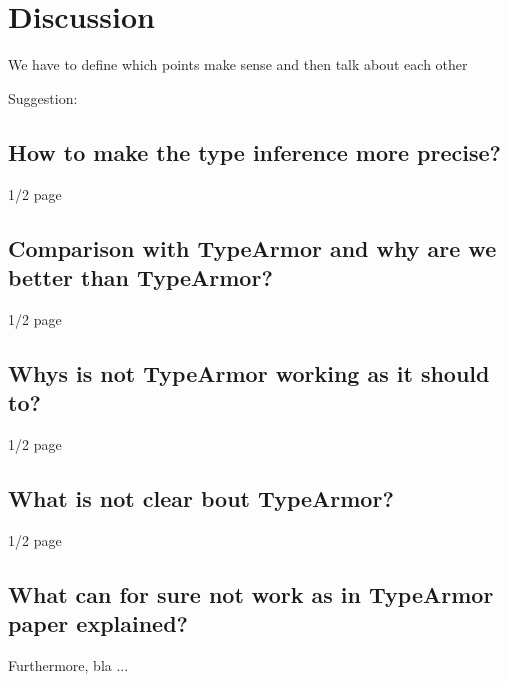 \chapter{Discussion}
\label{chapter:Discussion}

We have to define which points make sense and then talk about each other

Suggestion: \\

\section{How to make the type inference more precise?}
1/2 page

\section{Comparison with TypeArmor and why are we better than TypeArmor?}
1/2 page

\section{Whys is not TypeArmor working as it should to?}
1/2 page

\section{What is not clear bout TypeArmor?}
1/2 page

\section{What can for sure not work as in TypeArmor paper explained?}

Furthermore, bla ...


 